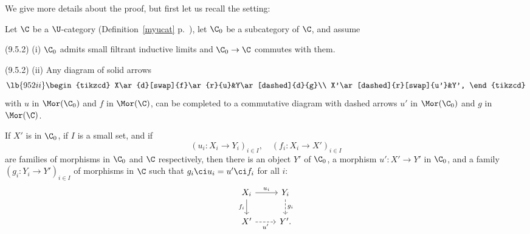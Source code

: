 \documentclass[12pt]{article}
\theoremstyle{remark}
\theoremstyle{definition}
\begin{document}


We give more details about the proof, but first let us recall the setting:

Let $\C$ be a $\U$-category (Definition~\ref{myucat} p.~), let $\C_0$ be a subcategory of $\C$, and assume 

\nn(9.5.2) (i) $\C_0$ admits small filtrant inductive limits and $\C_0\to\C$ commutes with them.

\nn(9.5.2) (ii) Any diagram of solid arrows 
\begin{equation}\lb{952ii}
\begin{tikzcd}
X\ar{d}[swap]{f}\ar{r}{u}&Y\ar[dashed]{d}{g}\\ 
X'\ar[dashed]{r}[swap]{u'}&Y',
\end{tikzcd}
\end{equation} 
with $u$ in $\Mor(\C_0)$ and $f$ in $\Mor(\C)$, can be completed to a commutative diagram with dashed arrows $u'$ in $\Mor(\C_0)$ and $g$ in $\Mor(\C)$.

\begin{lem}[Lemma 9.5.3 p. 231] 
If $X'$ is in $\C_0$, if $I$ is a small set, and if  
$$
(u_i:X_i\to Y_i)_{i\in I},\quad(f_i:X_i\to X')_{i\in I}
$$ 
are families of morphisms in $\C_0$ and $\C$ respectively, then there is an object $Y'$ of $\C_0$, a morphism $u':X'\to Y'$ in $\C_0$, and a family $(g_i:Y_i\to Y')_{i\in I}$ of morphisms in $\C$ such that $g_i\ci u_i=u'\ci f_i$ for all $i$:
$$
\begin{tikzcd}
X_i\ar{d}[swap]{f_i}\ar{r}{u_i}&Y_i\ar[dashed]{d}{g_i}\\ 
X'\ar[dashed]{r}[swap]{u'}&Y'.
\end{tikzcd}
$$ 
\end{lem} 
\end{document}
